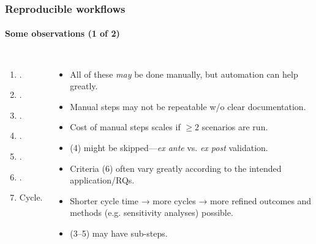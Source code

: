 \documentclass[12pt,aspectratio=169]{beamer}
\begin{document}
\begin{frame}
\frametitle{Reproducible workflows}
\framesubtitle{Some observations (1 of 2)}

\begin{columns}[T]
\begin{enumerate}
  \item {}.
  \item {}.
  \item {}.
  \item {}.
  \item {}.
  \item {}.
  \item Cycle.
\end{enumerate}

\begin{itemize}
  \item All of these \emph{may} be done manually, but automation can help greatly.
  \item Manual steps may not be repeatable w/o clear documentation.
  \item Cost of manual steps scales if $\geq 2$ scenarios are run.
  \item (4) might be skipped—\emph{ex ante} vs. \emph{ex post} validation.
  \item Criteria (6) often vary greatly according to the intended application/RQs.
  \item Shorter cycle time → more cycles → more refined outcomes and methods (e.g. sensitivity analyses) possible.
  \item (3–5) may have sub-steps.
\end{itemize}

\end{columns}
\end{frame}
\end{document}
